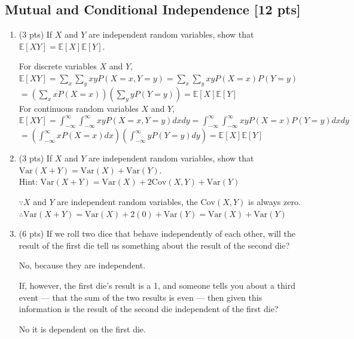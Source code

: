 \documentclass[a4paper]{article}
\theoremstyle{definition}
\newcommand{\Var}{\mathrm{Var}}
\newcommand{\Cov}{\mathrm{Cov}}
\newenvironment{soln}{
	\leavevmode\color{blue}\ignorespaces
}{}
\begin{document}
	\subsection{Mutual and Conditional Independence [12 pts]}
	\begin{enumerate}
		\item (3 pts) If $X$ and $Y$ are independent random variables, show that
		$\mathbb{E}[XY] = \mathbb{E}[X]\mathbb{E}[Y]$.
		
		\begin{soln}  For discrete variables $X$ and $Y$, \\ $ \mathbb{E}[XY] = \sum_{x} \sum_{y} xyP(X = x, Y = y) = \sum_{x} \sum_{y} xyP(X = x)P(Y = y) $ \\ $= (\sum_{x}xP(X=x))(\sum_{y}yP(Y=y)) = \mathbb{E}[X] \mathbb{E}[Y] $ \\ For continuous random variables $X$ and $Y$, \\ $ \mathbb{E}[XY] = \int_{-\infty}^{\infty} \int_{-\infty}^{\infty} xyP(X = x, Y = y) dx dy = \int_{-\infty}^{\infty} \int_{-\infty}^{\infty} xyP(X = x)P(Y = y) dx dy $ \\ $= (\int_{-\infty}^{\infty}xP(X=x)dx)(\int_{-\infty}^{\infty}yP(Y=y)dy) = \mathbb{E}[X] \mathbb{E}[Y] $\end{soln}
		
		\item (3 pts) If $X$ and $Y$ are independent random variables, show that
		$\Var(X+Y) = \Var(X) + \Var(Y)$. \\
		Hint: $\Var(X+Y) = \Var(X) + 2\Cov(X, Y) + \Var(Y)$
		
		\begin{soln} $ \because X $ and $ Y $ are independent random variables, the $ \Cov(X,Y) $ is always zero. \\ $ \therefore \Var(X+Y) = \Var(X) + 2(0) + \Var(Y) = \Var(X) + \Var(Y) $ \end{soln}
		
		\item (6 pts) If we roll two dice that behave independently of each
		other, will the result of the first die tell us something about the
		result of the second die? 
		
		\begin{soln} No, because they are independent. \end{soln}
		
		If, however, the first die's result is a 1,
		and someone tells you about a third event --- that the sum of the two
		results is even --- then given this information is the result of the second die
		independent of the first die? 
		
		\begin{soln} No it is dependent on the first die. \end{soln}
	\end{enumerate}
	
\end{document}
